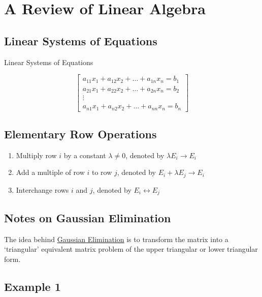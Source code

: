 \section{A Review of Linear Algebra}
%
%
%
\subsection{Linear Systems of Equations}

Linear Systems of Equations

\begin{equation*}
  \begin{bmatrix}
    a_{11} x_1 + a_{12} x_2 + \dots + a_{1n} x_n = b_1 \\
    a_{21} x_1 + a_{22} x_2 + \dots + a_{2n} x_n = b_2 \\
    \vdots \\
    a_{n1} x_1 + a_{n2} x_2 + \dots + a_{nn} x_n = b_n
  \end{bmatrix}
\end{equation*}

\subsection{Elementary Row Operations}

\begin{enumerate}
\item Multiply row $i$ by a constant $\lambda \ne 0$, denoted by 
  $\lambda E_i \to E_i$
\item Add a multiple of row $i$ to row $j$, denoted by $E_i + \lambda E_j \to E_i$
\item Interchange rows $i$ and $j$, denoted by $E_i \leftrightarrow E_j$
\end{enumerate}

\subsection{Notes on Gaussian Elimination}

The idea behind \uline{Gaussian Elimination} is to transform the matrix into
a \enquote*{triangular} equivalent matrix problem of the upper triangular
or lower triangular form.

\subsection{Example 1}

